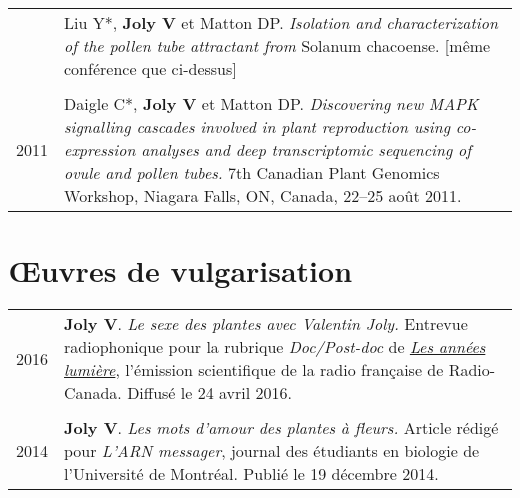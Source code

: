 \documentclass[letterpaper,12pt]{article}
\begin{document}
\begin{tabularx}{\textwidth}{@{}r|X@{}}
& Liu Y*, \textbf{Joly V} et Matton DP.
  \emph{Isolation and characterization of the pollen tube attractant from}
  Solanum chacoense. [même conférence que ci-dessus] \\

\multicolumn{2}{c}{} \\

2011
& Daigle C*, \textbf{Joly V} et Matton DP.
  \emph{Discovering new MAPK signalling cascades involved in plant reproduction
  using co-expression analyses and deep transcriptomic sequencing of ovule
  and pollen tubes.}
  7th Canadian Plant Genomics Workshop, Niagara Falls, ON, Canada,
  22--25 août 2011.
  \\

\end{tabularx}

\vspace{6mm}

\section[Vulgarisation]{Œuvres de vulgarisation}

\begin{tabularx}{\textwidth}{@{}r|X@{}}

2016 & \textbf{Joly V}. {\em Le sexe des plantes avec Valentin Joly.} Entrevue radiophonique pour la rubrique {\em Doc/Post-doc} de \href{http://ici.radio-canada.ca/emissions/les_annees_lumiere/2015-2016/chronique.asp?idChronique=404672}{\em Les années lumière}, l’émission scientifique de la radio française de Radio-Canada. Diffusé le 24 avril 2016. \\

\multicolumn{2}{c}{} \\

2014 & \textbf{Joly V}. {\em Les mots d’amour des plantes à fleurs.} Article rédigé pour {\em L’ARN messager}, journal des étudiants en biologie de l’Université de Montréal. Publié le 19 décembre 2014. \\

\end{tabularx}

\newpage

\end{document}
